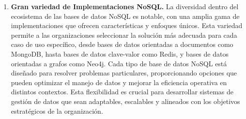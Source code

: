 \documentclass[pdflatex,sn-mathphys-num]{sn-jnl}
\theoremstyle{thmstyleone}%
\theoremstyle{thmstyletwo}%
\theoremstyle{thmstylethree}%
\begin{document}
\begin{enumerate}
    \item \textbf{Gran variedad de Implementaciones NoSQL.} La diversidad dentro del ecosistema de las bases de datos NoSQL es notable, con una amplia gama de implementaciones que ofrecen características y enfoques únicos. Esta variedad permite a las organizaciones seleccionar la solución más adecuada para cada caso de uso específico, desde bases de datos orientadas a documentos como MongoDB, hasta bases de datos clave-valor como Redis, y bases de datos orientadas a grafos como Neo4j. Cada tipo de base de datos NoSQL está diseñado para resolver problemas particulares, proporcionando opciones que pueden optimizar el manejo de datos y mejorar la eficiencia operativa en distintos contextos. Esta flexibilidad es crucial para desarrollar sistemas de gestión de datos que sean adaptables, escalables y alineados con los objetivos estratégicos de la organización.
\end{enumerate}

\newpage

\label{sec8}
\end{document}
